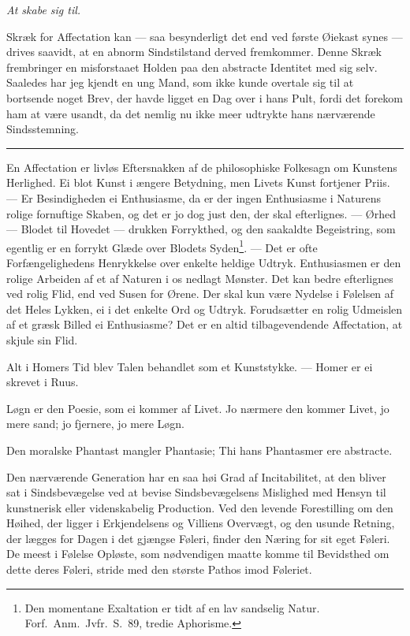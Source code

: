 \documentclass[12pt]{article}
\newcommand{\opage}[1]{\marginnote{\footnotesize\textit{[#1]}}}
\newcommand{\ombreak}{\par\medskip\begin{center}\rule{0.32\textwidth}{0.4pt}\end{center}\medskip}
\begin{document}
\emph{At skabe sig til.}

Skræk for Affectation kan --- saa besynderligt det end ved første Øiekast synes --- drives saavidt, at en abnorm Sindstilstand derved fremkommer. Denne Skræk frembringer en misforstaaet Holden paa den abstracte Identitet med sig selv. Saaledes har jeg kjendt en ung Mand, som ikke kunde overtale sig til at bortsende noget Brev, der havde ligget en Dag over i hans Pult, fordi det forekom ham at være usandt, da det nemlig nu ikke meer udtrykte hans nærværende Sindsstemning.

\ombreak

\opage{182}En Affectation er livløs Eftersnakken af de philosophiske Folkesagn om Kunstens Herlighed. Ei blot Kunst i ængere Betydning, men Livets Kunst fortjener Priis. --- Er Besindigheden ei Enthusiasme, da er der ingen Enthusiasme i Naturens rolige fornuftige Skaben, og det er jo dog just den, der skal efterlignes. --- Ørhed --- Blodet til Hovedet --- drukken Forrykthed, og den saakaldte Begeistring, som egentlig er en forrykt Glæde over Blodets Syden\footnote{Den momentane Exaltation er tidt af en lav sandselig Natur. Forf.\ Anm.\ Jvfr.\ S.\ 89, tredie Aphorisme.}. --- Det er ofte Forfængelighedens Henrykkelse over enkelte heldige Udtryk. Enthusiasmen er den rolige Arbeiden af et af Naturen i os nedlagt Mønster. Det kan bedre efterlignes ved rolig Flid, end ved Susen for Ørene. Der skal kun være Nydelse i Følelsen af det Heles Lykken, ei i det enkelte Ord og Udtryk. Forudsætter en rolig Udmeislen af et græsk Billed ei Enthusiasme? Det er en altid tilbagevendende Affectation, at skjule sin Flid.

Alt i Homers Tid blev Talen behandlet som et Kunststykke. --- Homer er ei skrevet i Ruus.

Løgn er den Poesie, som ei kommer af Livet. Jo nærmere den kommer Livet, jo mere sand; jo fjernere, jo mere Løgn.

Den moralske Phantast mangler Phantasie; Thi hans Phantasmer ere abstracte.

Den nærværende Generation har en saa høi Grad af Incitabilitet, at den bliver sat i Sindsbevægelse ved at bevise Sindsbevægelsens Mislighed med Hensyn til kunstnerisk eller videnskabelig Production. Ved den levende Forestilling om den Høihed, der ligger i Erkjendelsens og Villiens Overvægt, og den usunde \opage{183}Retning, der lægges for Dagen i det gjængse Føleri, finder den Næring for sit eget Føleri. De meest i Følelse Opløste, som nødvendigen maatte komme til Bevidsthed om dette deres Føleri, stride med den største Pathos imod Føleriet.
\end{document}
